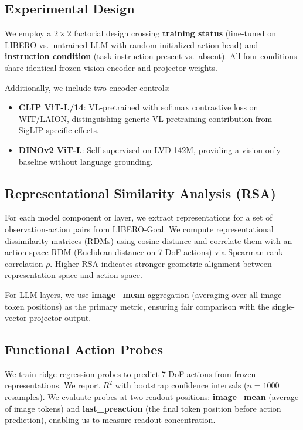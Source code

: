 \documentclass[letterpaper]{article}
\begin{document}
\subsection{Experimental Design}

We employ a $2 \times 2$ factorial design crossing \textbf{training status} (fine-tuned on LIBERO vs.\ untrained LLM with random-initialized action head) and \textbf{instruction condition} (task instruction present vs.\ absent).
All four conditions share identical frozen vision encoder and projector weights.

Additionally, we include two encoder controls:
\begin{itemize}
  \item \textbf{CLIP ViT-L/14}: VL-pretrained with softmax contrastive loss on WIT/LAION, distinguishing generic VL pretraining contribution from SigLIP-specific effects.
  \item \textbf{DINOv2 ViT-L}: Self-supervised on LVD-142M, providing a vision-only baseline without language grounding.
\end{itemize}

\subsection{Representational Similarity Analysis (RSA)}

For each model component or layer, we extract representations for a set of observation-action pairs from LIBERO-Goal.
We compute representational dissimilarity matrices (RDMs) using cosine distance and correlate them with an action-space RDM (Euclidean distance on 7-DoF actions) via Spearman rank correlation $\rho$.
Higher RSA indicates stronger geometric alignment between representation space and action space.

For LLM layers, we use \textbf{image\_mean} aggregation (averaging over all image token positions) as the primary metric, ensuring fair comparison with the single-vector projector output.

\subsection{Functional Action Probes}

We train ridge regression probes to predict 7-DoF actions from frozen representations.
We report $R^2$ with bootstrap confidence intervals ($n{=}1000$ resamples).
We evaluate probes at two readout positions: \textbf{image\_mean} (average of image tokens) and \textbf{last\_preaction} (the final token position before action prediction), enabling us to measure readout concentration.
\end{document}
